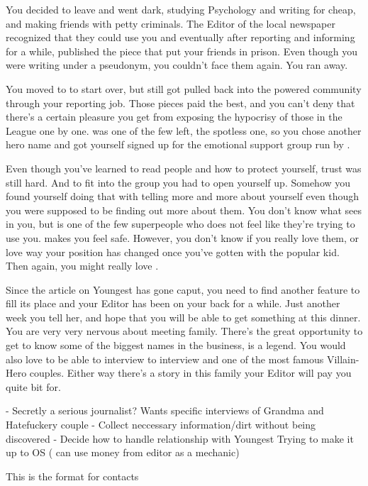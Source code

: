 \documentclass[char]{LRSguildcamp1}
\begin{document}
You decided to leave and went dark, studying Psychology and writing for cheap, and making friends with petty criminals. The Editor of the local newspaper recognized that they could use you and eventually after reporting and informing for a while, published the piece that put your friends in prison. Even though you were writing under a pseudonym, you couldn't face them again. You ran away. 

You moved to \pCityYoungest{} to start over, but still got pulled back into the powered community through your reporting job. Those pieces paid the best, and you can't deny that there's a certain pleasure you get from exposing the hypocrisy of those in the League one by one. \cYoungest{} was one of the few left, the spotless one, so you chose another hero name and got yourself signed up for the emotional support group run by \cYoungest{}. 

Even though you've learned to read people and how to protect yourself, trust was still hard. And to fit into the group you had to open yourself up. Somehow you found yourself doing that with \cYoungest{} telling \cYoungest{} more and more about yourself even though you were supposed to be finding out more about them. You don't know what \cYoungest{} sees in you, but \cYoungest{} is one of the few superpeople who does not feel like they're trying to use you. \cYoungest{} makes you feel safe. However, you don't know if you really love them, or love way your position has changed once you've gotten with the popular kid. Then again, you might really love \cYoungest{}. 

Since the article on Youngest has gone caput, you need to find another feature to fill its place and your Editor has been on your back for a while. Just another week you tell her, and hope that you will be able to get something at this dinner. You are very very nervous about meeting \cYoungest{} family. There’s the great opportunity to get to know some of the biggest names in the business, \cGrandma{} is a legend. You would also love to be able to interview to interview \cOldest{} and \cOS{} one of the most famous Villain-Hero couples. Either way there's a story in this family your Editor will pay you quite bit for. 




\begin{itemz}[Goals]
	\item 
\end{itemz}

\begin{itemz}[Notes]
	\item 
	- Secretly a serious journalist?  Wants specific interviews of Grandma and Hatefuckery couple 
	- Collect neccessary information/dirt without being discovered
	- Decide how to handle relationship with Youngest 
	Trying to make it up to OS ( can use money from editor as a mechanic)
	
\end{itemz}

\begin{contacts}
	\contact{} This is the format for contacts 
\end{contacts}
\end{document}
